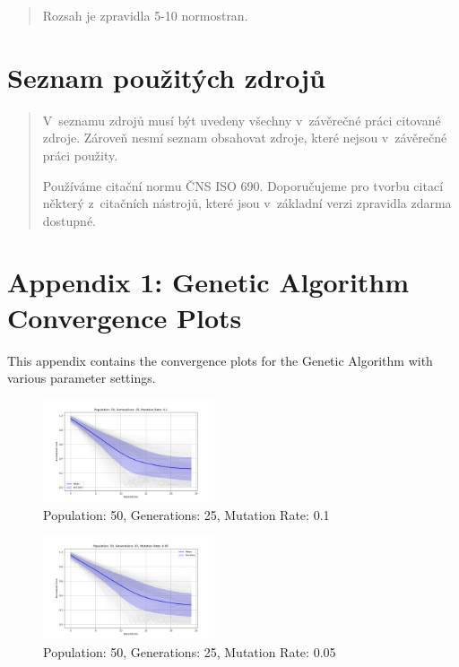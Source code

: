 \documentclass[
]{article}
\begin{document}
    \begin{quote}
        Rozsah je zpravidla 5-10 normostran.
    \end{quote}

    \newpage
    \hypertarget{seznam-pouux17eituxfdch-zdrojux16f}{%
        \section{Seznam použitých
        zdrojů}\label{seznam-pouux17eituxfdch-zdrojux16f}}

    \begin{quote}
        V~seznamu zdrojů musí být uvedeny všechny v~závěrečné práci citované
        zdroje. Zároveň nesmí seznam obsahovat zdroje, které nejsou v~závěrečné
        práci použity.

        Používáme citační normu ČNS ISO 690. Doporučujeme pro tvorbu citací
        některý z~citačních nástrojů, které jsou v~základní verzi zpravidla
        zdarma dostupné.
    \end{quote}

    \newpage
    \appendix


    \section{Appendix 1: Genetic Algorithm Convergence Plots}

    This appendix contains the convergence plots for the Genetic Algorithm with various parameter settings.

    \begin{figure}[H]
        \centering
        \includegraphics[width=0.45\textwidth]{genetic_algorithm/appendix/Population_50_Generations_25_MutationRate_0.1}
        \caption{Population: 50, Generations: 25, Mutation Rate: 0.1}
        \label{fig:app_ga_50_25_1}
    \end{figure}

    \begin{figure}[H]
        \centering
        \includegraphics[width=0.45\textwidth]{genetic_algorithm/appendix/Population_50_Generations_25_MutationRate_0.05}
        \caption{Population: 50, Generations: 25, Mutation Rate: 0.05}
        \label{fig:app_ga_50_25_05}
    \end{figure}
\end{document}
